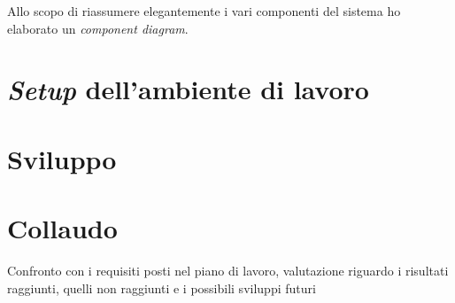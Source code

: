 Allo scopo di riassumere elegantemente i vari componenti del sistema ho elaborato un  \textit{component diagram}.




\section{\textit{Setup} dell'ambiente di lavoro}


\section{Sviluppo}


\section{Collaudo}

Confronto con i requisiti posti nel piano di lavoro, valutazione riguardo i risultati raggiunti, quelli non raggiunti e i possibili sviluppi futuri
